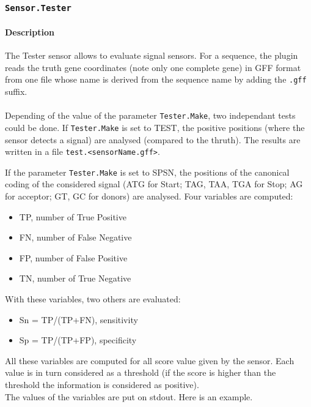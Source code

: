 
\subsubsection{\texttt{Sensor.Tester}}

\paragraph{Description}

The Tester sensor allows to evaluate signal sensors. For a sequence,
the plugin reads the truth gene coordinates (note only one complete gene) in GFF format from one file whose name
is derived from the sequence name by adding the \texttt{.gff} suffix.\\
\\
Depending of the value of the parameter \texttt{Tester.Make}, two independant tests could be done. If \texttt{Tester.Make} is set to TEST, the positive positions (where the sensor detects a signal) are analysed (compared to the thruth). The results are written in a file \texttt{test.<sensorName.gff>}. 

If the parameter \texttt{Tester.Make} is set to SPSN, the positions of the canonical coding of the considered signal (ATG for Start; TAG, TAA, TGA for Stop; AG for acceptor; GT, GC for donors) are analysed. Four variables are computed:
\begin{itemize} 
\item TP, number of True Positive
\item FN, number of False Negative
\item FP, number of False Positive
\item TN, number of True Negative
\end {itemize}
With these variables, two others are evaluated:
\begin {itemize}
\item Sn = TP/(TP+FN), sensitivity
\item Sp = TP/(TP+FP), specificity
\end {itemize}

All these variables are computed for all score value given by the sensor. Each value is in turn considered as a threshold (if the score is higher than the threshold the information is considered as positive).\\
The values of the variables are put on stdout. Here is an example.

